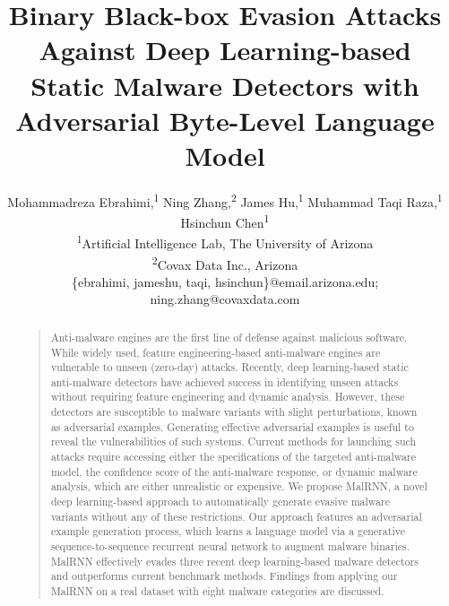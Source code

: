 \documentclass[letterpaper]{article}
\begin{document}
%
\title{Binary Black-box Evasion Attacks Against Deep Learning-based Static Malware Detectors with Adversarial Byte-Level Language Model}


\author{Mohammadreza Ebrahimi,\textsuperscript{1}
Ning Zhang,\textsuperscript{2}
James Hu,\textsuperscript{1}
Muhammad Taqi Raza,\textsuperscript{1}
Hsinchun Chen\textsuperscript{1}\\
\textsuperscript{1}{Artificial Intelligence Lab, The University of Arizona}\\
\textsuperscript{2}{Covax Data Inc., Arizona}\\
\{ebrahimi, jameshu, taqi, hsinchun\}@email.arizona.edu; ning.zhang@covaxdata.com
}


\maketitle
\begin{abstract}
\begin{quote}
Anti-malware engines are the first line of defense against malicious software. While widely used, feature engineering-based anti-malware engines are vulnerable to unseen (zero-day) attacks. Recently, deep learning-based static anti-malware detectors have achieved success in identifying unseen attacks without requiring feature engineering and dynamic analysis. However, these detectors are susceptible to malware variants with slight perturbations, known as adversarial examples. Generating effective adversarial examples is useful to reveal the vulnerabilities of such systems. Current methods for launching such attacks require accessing either the specifications of the targeted anti-malware model, the confidence score of the anti-malware response, or dynamic malware analysis, which are either unrealistic or expensive. We propose MalRNN, a novel deep learning-based approach to automatically generate evasive malware variants without any of these restrictions. Our approach features an adversarial example generation process, which learns a language model via a generative sequence-to-sequence recurrent neural network to augment malware binaries. MalRNN effectively evades three recent deep learning-based malware detectors and outperforms current benchmark methods. Findings from applying our MalRNN on a real dataset with eight malware categories are discussed. 
\end{quote}
\end{abstract}
\end{document}
